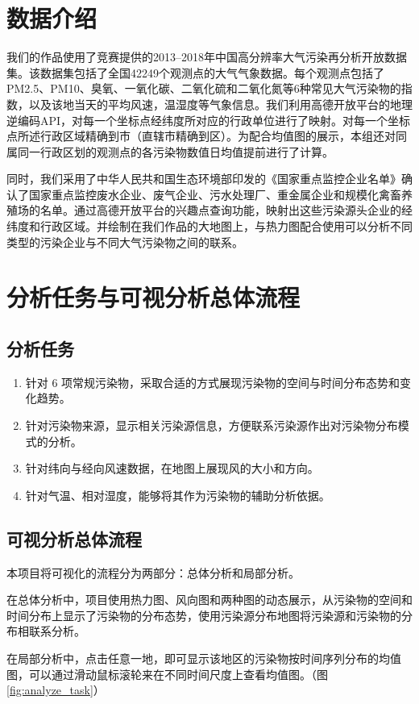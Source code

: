 \documentclass[UTF8]{ctexrep}
\begin{document}
    \section{数据介绍}

    我们的作品使用了竞赛提供的2013–2018年中国高分辨率大气污染再分析开放数据集。该数据集包括了全国42249个观测点的大气气象数据。每个观测点包括了PM2.5、PM10、臭氧、一氧化碳、二氧化硫和二氧化氮等6种常见大气污染物的指数，以及该地当天的平均风速，温湿度等气象信息。我们利用高德开放平台的地理逆编码API，对每一个坐标点经纬度所对应的行政单位进行了映射。对每一个坐标点所述行政区域精确到市（直辖市精确到区）。为配合均值图的展示，本组还对同属同一行政区划的观测点的各污染物数值日均值提前进行了计算。

    同时，我们采用了中华人民共和国生态环境部印发的《国家重点监控企业名单》确认了国家重点监控废水企业、废气企业、污水处理厂、重金属企业和规模化禽畜养殖场的名单。通过高德开放平台的兴趣点查询功能，映射出这些污染源头企业的经纬度和行政区域。并绘制在我们作品的大地图上，与热力图配合使用可以分析不同类型的污染企业与不同大气污染物之间的联系。\\

    \section{分析任务与可视分析总体流程}
    
    \subsection{分析任务}
    \begin{enumerate}
    	\item 针对 6 项常规污染物，采取合适的方式展现污染物的空间与时间分布态势和变化趋势。
    	\item 针对污染物来源，显示相关污染源信息，方便联系污染源作出对污染物分布模式的分析。
    	\item 针对纬向与经向风速数据，在地图上展现风的大小和方向。
    	\item 针对气温、相对湿度，能够将其作为污染物的辅助分析依据。
    \end{enumerate}

	\subsection{可视分析总体流程}
    本项目将可视化的流程分为两部分：总体分析和局部分析。
    \par
    在总体分析中，项目使用热力图、风向图和两种图的动态展示，从污染物的空间和时间分布上显示了污染物的分布态势，使用污染源分布地图将污染源和污染物的分布相联系分析。
    \par
    在局部分析中，点击任意一地，即可显示该地区的污染物按时间序列分布的均值图，可以通过滑动鼠标滚轮来在不同时间尺度上查看均值图。（图 \ref{fig:analyze_task}）
	
\end{document}
